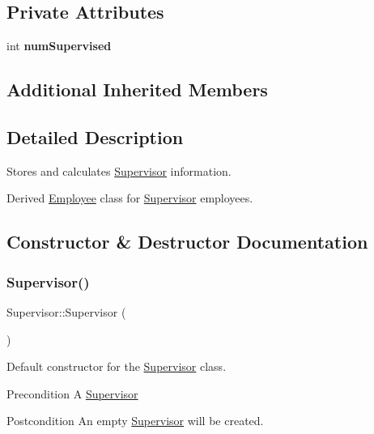 \subsection*{Private Attributes}
\begin{DoxyCompactItemize}
\item 
\mbox{\label{classSupervisor_af8b7097d8147c93a68d1f63c5b898797}} 
int {\bfseries num\+Supervised}
\end{DoxyCompactItemize}
\subsection*{Additional Inherited Members}


\subsection{Detailed Description}
Stores and calculates \hyperlink{classSupervisor}{Supervisor} information. 

Derived \hyperlink{classEmployee}{Employee} class for \hyperlink{classSupervisor}{Supervisor} employees. 

\subsection{Constructor \& Destructor Documentation}
\mbox{\label{classSupervisor_a9d7eafc36b5429092ba0f758bc7841c4}} 
\subsubsection{\texorpdfstring{Supervisor()}{Supervisor()}\hspace{0.1cm}{\footnotesize\ttfamily [1/2]}}
{\footnotesize\ttfamily Supervisor\+::\+Supervisor (\begin{DoxyParamCaption}{ }\end{DoxyParamCaption})}

Default constructor for the \hyperlink{classSupervisor}{Supervisor} class.

\begin{DoxyPrecond}{Precondition}
A \hyperlink{classSupervisor}{Supervisor} 
\end{DoxyPrecond}
\begin{DoxyPostcond}{Postcondition}
An empty \hyperlink{classSupervisor}{Supervisor} will be created. 
\end{DoxyPostcond}
\mbox{\label{classSupervisor_a02d9245744652deb20e9408001d6ed3b}} 
